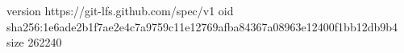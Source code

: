 version https://git-lfs.github.com/spec/v1
oid sha256:1e6ade2b1f7ae2e4c7a9759c11e12769afba84367a08963e12400f1bb12db9b4
size 262240
